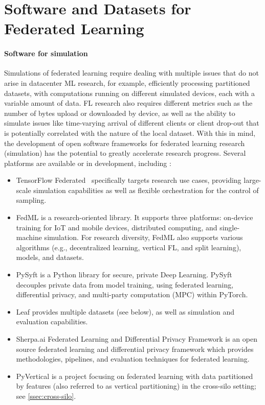 \section{Software and Datasets for Federated Learning}
\label{sec:datasets-and-software}

\paragraph{Software for simulation} Simulations of federated learning require dealing with multiple issues that do not arise in datacenter ML research, for example, efficiently processing partitioned datasets, with computations running on different simulated devices, each with a variable amount of data. FL research also requires different metrics such as the number of bytes upload or downloaded by device, as well as the ability to simulate issues like time-varying arrival of different clients or client drop-out that is potentially correlated with the nature of the local dataset. With this in mind, the development of open software frameworks for federated learning research (simulation) has the potential to greatly accelerate research progress. Several platforms are available or in development, including \cite{sathya2018review}:
\begin{itemize}
    \item TensorFlow Federated~\citep{tff} specifically targets research use cases, providing large-scale simulation capabilities as well as flexible orchestration for the control of sampling.  
    \item FedML \citep{he2020fedml} is a research-oriented library. It supports three platforms: on-device training for IoT and mobile devices, distributed computing, and single-machine simulation. For research diversity, FedML also supports various algorithms (e.g., decentralized learning, vertical FL, and split learning), models, and datasets.
    \item PySyft \citep{PySyft}  is a Python library for secure, private Deep Learning. PySyft decouples private data from model training, using federated learning, differential privacy, and multi-party computation (MPC) within PyTorch.  
    \item Leaf \citep{Leaf} provides multiple datasets (see below), as well as simulation and evaluation capabilities.
    \item Sherpa.ai Federated Learning and Differential Privacy Framework \citep{rodriguez2020federated} is an open source federated learning and differential privacy framework which provides methodologies, pipelines, and evaluation techniques for federated learning.
    \item PyVertical \citep{PyVertical} is a project focusing on federated learning with data partitioned by features (also referred to as vertical partitioning) in the cross-silo setting; see \cref{ssec:cross-silo}.
\end{itemize}
